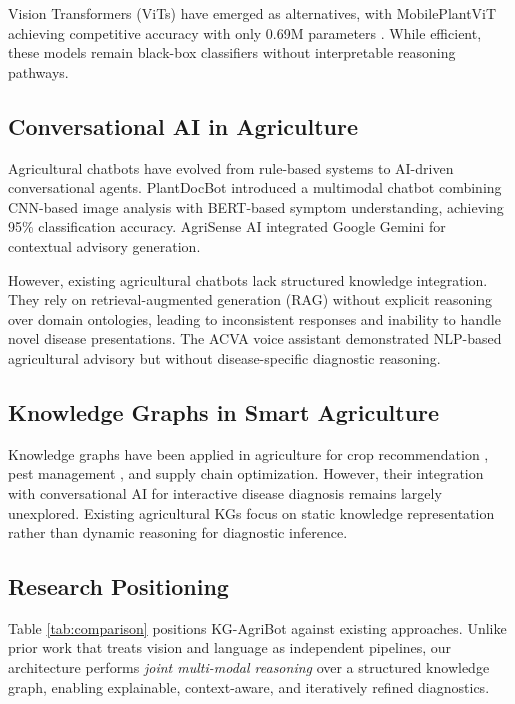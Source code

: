 \documentclass[conference]{IEEEtran}
\begin{document}
Vision Transformers (ViTs) have emerged as alternatives, with MobilePlantViT achieving competitive accuracy with only 0.69M parameters \cite{mobileplantvit}. While efficient, these models remain black-box classifiers without interpretable reasoning pathways.

\subsection{Conversational AI in Agriculture}

Agricultural chatbots have evolved from rule-based systems to AI-driven conversational agents. PlantDocBot \cite{plantdocbot} introduced a multimodal chatbot combining CNN-based image analysis with BERT-based symptom understanding, achieving 95\% classification accuracy. AgriSense AI \cite{agrosense} integrated Google Gemini for contextual advisory generation.

However, existing agricultural chatbots lack structured knowledge integration. They rely on retrieval-augmented generation (RAG) without explicit reasoning over domain ontologies, leading to inconsistent responses and inability to handle novel disease presentations. The ACVA voice assistant \cite{acva} demonstrated NLP-based agricultural advisory but without disease-specific diagnostic reasoning.

\subsection{Knowledge Graphs in Smart Agriculture}

Knowledge graphs have been applied in agriculture for crop recommendation \cite{kg_crop}, pest management \cite{kg_pest}, and supply chain optimization. However, their integration with conversational AI for interactive disease diagnosis remains largely unexplored. Existing agricultural KGs focus on static knowledge representation rather than dynamic reasoning for diagnostic inference.

\subsection{Research Positioning}

Table \ref{tab:comparison} positions KG-AgriBot against existing approaches. Unlike prior work that treats vision and language as independent pipelines, our architecture performs \textit{joint multi-modal reasoning} over a structured knowledge graph, enabling explainable, context-aware, and iteratively refined diagnostics.
\end{document}
